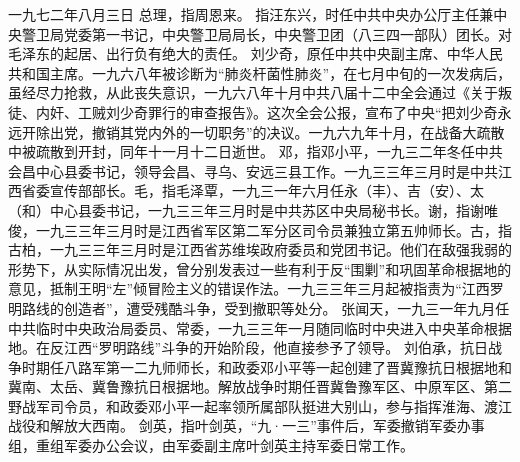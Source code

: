\begin{maonote}
一九七二年八月三日
总理，指周恩来。
指汪东兴，时任中共中央办公厅主任兼中央警卫局党委第一书记，中央警卫局局长，中央警卫团（八三四一部队）团长。对毛泽东的起居、出行负有绝大的责任。
刘少奇，原任中共中央副主席、中华人民共和国主席。一九六八年被诊断为“肺炎杆菌性肺炎”，在七月中旬的一次发病后，虽经尽力抢救，从此丧失意识，一九六八年十月中共八届十二中全会通过《关于叛徒、内奸、工贼刘少奇罪行的审查报告》。这次全会公报，宣布了中央“把刘少奇永远开除出党，撤销其党内外的一切职务”的决议。一九六九年十月，在战备大疏散中被疏散到开封，同年十一月十二日逝世。
邓，指邓小平，一九三二年冬任中共会昌中心县委书记，领导会昌、寻乌、安远三县工作。一九三三年三月时是中共江西省委宣传部部长。毛，指毛泽覃，一九三一年六月任永（丰）、吉（安）、太（和）中心县委书记，一九三三年三月时是中共苏区中央局秘书长。谢，指谢唯俊，一九三三年三月时是江西省军区第二军分区司令员兼独立第五帅师长。古，指古柏，一九三三年三月时是江西省苏维埃政府委员和党团书记。他们在敌强我弱的形势下，从实际情况出发，曾分别发表过一些有利于反“围剿”和巩固革命根据地的意见，抵制王明“左”倾冒险主义的错误作法。一九三三年三月起被指责为“江西罗明路线的创造者”，遭受残酷斗争，受到撤职等处分。
张闻天，一九三一年九月任中共临时中央政治局委员、常委，一九三三年一月随同临时中央进入中央革命根据地。在反江西“罗明路线”斗争的开始阶段，他直接参予了领导。
刘伯承，抗日战争时期任八路军第一二九师师长，和政委邓小平等一起创建了晋冀豫抗日根据地和冀南、太岳、冀鲁豫抗日根据地。解放战争时期任晋冀鲁豫军区、中原军区、第二野战军司令员，和政委邓小平一起率领所属部队挺进大别山，参与指挥淮海、渡江战役和解放大西南。
剑英，指叶剑英，“九·一三”事件后，军委撤销军委办事组，重组军委办公会议，由军委副主席叶剑英主持军委日常工作。
\end{maonote}
